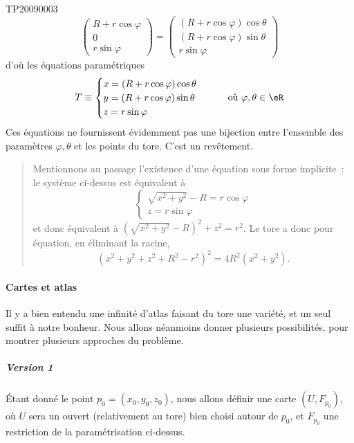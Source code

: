 \begin{corrige}{TP20090003}
\begin{equation*}
\begin{pmatrix}
    R + r\cos \varphi\\
    0\\
    r \sin \varphi
  \end{pmatrix}
  =
  \begin{pmatrix}
   (R + r\cos \varphi) \cos \theta\\
   (R + r\cos \varphi) \sin \theta\\
   r \sin \varphi
  \end{pmatrix}
\end{equation*}
d'où les équations paramétriques
\begin{equation}\label{torus_parameq}
  T \equiv
  \begin{cases}
    x = (R + r\cos \varphi) \cos \theta\\
    y = (R + r\cos \varphi) \sin \theta\\
    z = r \sin \varphi
  \end{cases} \qquad \text{où }\varphi,\theta \in \eR
\end{equation}
Ces équations ne fournissent évidemment pas une bijection entre
l'ensemble des paramètres $\varphi,\theta$ et les points du tore. C'est
un revêtement.

\begin{quote}
  Mentionnons au passage l'existence d'une équation sous forme
  implicite~: le système ci-dessus est équivalent à
  \begin{equation*}
    \begin{cases}
      \sqrt{x^2+y^2} - R = r \cos \varphi\\
      z = r \sin \varphi
    \end{cases}
  \end{equation*}
  et donc équivalent à $(\sqrt{x^2+y^2} - R)^2 + z^2 = r^2$. Le tore a
  donc pour équation, en éliminant la racine,
  \begin{equation*}
    (x^2 + y^2 + z^2 + R^2 - r^2)^2 = 4 R^2 (x^2+y^2).
  \end{equation*}
\end{quote}

\paragraph{Cartes et atlas}
Il y a bien entendu une infinité d'atlas faisant du tore une variété,
et un seul suffit à notre bonheur. Nous allons néanmoins donner
plusieurs possibilités, pour montrer plusieurs approches du
problème.

\subparagraph{Version 1} Étant donné le point $p_0 = (x_0,y_0,z_0)$,
nous allons définir une carte $(U,F_{p_0})$, où $U$ sera un ouvert
(relativement au tore) bien choisi autour de $p_0$, et $F_{p_0}$ une
restriction de la paramétrisation ci-dessus.


\end{corrige}
